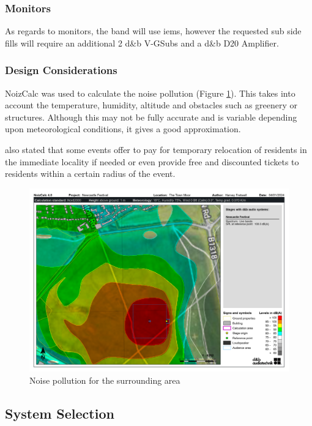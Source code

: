         \subsubsection{Monitors}
            As regards to monitors, the band will use \acrshort{iem}s, however the requested sub side fills will require an additional 2 d\&b V-GSubs and a d\&b D20 Amplifier.
            
        \subsubsection{Design Considerations}            
            NoizCalc was used to calculate the noise pollution (Figure \ref{fig:noise_pollution}). This takes into account the temperature, humidity, altitude and obstacles such as greenery or structures. Although this may not be fully accurate and is variable depending upon meteorological conditions, it gives a good approximation.

            \citet{lwestbury2016} also stated that some events offer to pay for temporary relocation of residents in the immediate locality if needed or even provide free and discounted tickets to residents within a certain radius of the event.
            
            \begin{figure}[H]
                \centering
                \includegraphics[width=1\linewidth]{Images/noise_polution.png}
                \caption{Noise pollution for the surrounding area}
                \label{fig:noise_pollution}
            \end{figure}

    \subsection{System Selection}        
